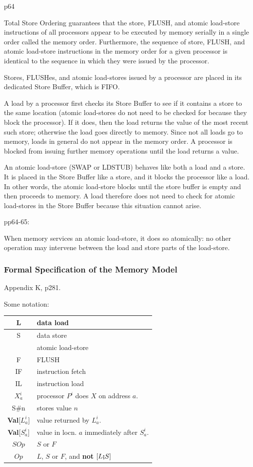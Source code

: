 p64

Total Store Ordering guarantees that the store, FLUSH,
and atomic load-store instructions of all processors
appear to be executed by memory serially
in a single order called the memory order.
Furthermore, the sequence of store, FLUSH,
and atomic load-store instructions in the memory order
for a given processor
is identical to the sequence in which they were issued by the processor.

Stores, FLUSHes, and atomic load-stores issued by a processor
are placed in its dedicated Store Buffer,
which is FIFO.

A load by a processor first checks its Store Buffer
to see if it contains a store to the same location
(atomic load-stores do not need to be checked for
because they block the processor).
If it does,
then the load returns the value of the most recent such store;
otherwise the load goes directly to memory.
Since not all loads go to memory,
loads in general do not appear in the memory order.
A processor is blocked from issuing further memory operations until the load returns a value.

An atomic load-store (SWAP or LDSTUB) behaves like both a load and a store.
It is placed in the Store Buffer like a store,
and it blocks the processor like a load.
In other words,
the atomic load-store blocks until the store buffer is empty
and then proceeds to memory.
A load therefore does not need to check
for atomic load-stores in the Store Buffer
because this situation cannot arise.

pp64-65:

When memory services an atomic load-store,
it does so atomically:
no other operation may intervene between
the load and store parts of the load-store.

\newpage
\subsubsection{Formal Specification of the Memory Model}

Appendix K, p281.

Some notation:

\begin{tabular}{|c|l|}
  \hline
  L & data load
\\\hline
  S & data store
\\\hline
  [L \iseq\ S] & atomic load-store
\\\hline
  F & FLUSH
\\\hline
  IF & instruction fetch
\\\hline
  IL & instruction load
\\\hline
  $X_a^i$ & processor $P^i$ does $X$ on address $a$.
\\\hline
  S\#n & stores value $n$
\\\hline
 \textbf{Val}[$L_a^i$] & value returned by $L_a^i$.
\\\hline
 \textbf{Val}[$S_a^i$] & value in locn. $a$ immediately after $S_a^i$.
\\\hline
  $SOp$ & $S$ or $F$
\\\hline
  $Op$ & $L$, $S$ or $F$, and \textbf{not} $[L \textbf{;} S]$
\\\hline
\end{tabular}

